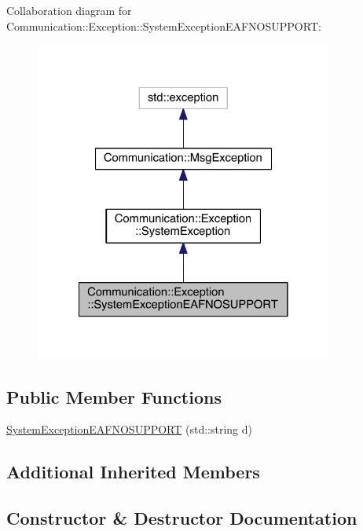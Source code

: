 Collaboration diagram for Communication\+:\+:Exception\+:\+:System\+Exception\+E\+A\+F\+N\+O\+S\+U\+P\+P\+O\+R\+T\+:\nopagebreak
\begin{figure}[H]
\begin{center}
\leavevmode
\includegraphics[width=278pt]{class_communication_1_1_exception_1_1_system_exception_e_a_f_n_o_s_u_p_p_o_r_t__coll__graph}
\end{center}
\end{figure}
\subsection*{Public Member Functions}
\begin{DoxyCompactItemize}
\item 
\hyperlink{class_communication_1_1_exception_1_1_system_exception_e_a_f_n_o_s_u_p_p_o_r_t_a7e71fbae14af4b0278709a89b2933ff4}{System\+Exception\+E\+A\+F\+N\+O\+S\+U\+P\+P\+O\+R\+T} (std\+::string d)
\end{DoxyCompactItemize}
\subsection*{Additional Inherited Members}


\subsection{Constructor \& Destructor Documentation}
\hypertarget{class_communication_1_1_exception_1_1_system_exception_e_a_f_n_o_s_u_p_p_o_r_t_a7e71fbae14af4b0278709a89b2933ff4}{}
